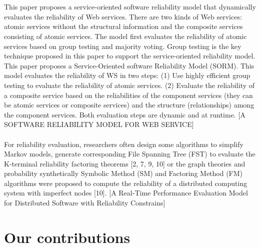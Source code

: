 \documentclass{cslthse-msc}
\begin{document}
\\\\
This paper proposes a service-oriented software reliability model that dynamically evaluates the reliability of Web services. There are two kinds of Web services: atomic services without the structural information and the composite services consisting of atomic services. The model first evaluates the reliability of atomic services based on group testing and majority voting. Group testing is the key technique proposed in this paper to support the service-oriented reliability model.
This paper proposes a Service-Oriented software Reliability Model (SORM). This model evaluates the reliability of WS in two steps: (1) Use highly efficient group testing to evaluate the reliability of atomic services.
(2) Evaluate the reliability of a composite service based on the reliabilities of the component services (they can be atomic services or composite services) and the structure (relationships) among the component services. Both evaluation steps are dynamic and at runtime. [A SOFTWARE RELIABILITY MODEL FOR WEB SERVICE]
\\\\
For reliability evaluation, researchers often design some algorithms to simplify Markov models, generate corresponding File Spanning Tree (FST) to evaluate the K-terminal reliability factoring theorems [2, 7, 9, 10] or the graph theories and probability synthetically 
Symbolic Method (SM) and Factoring Method (FM) algorithms were proposed to compute the reliability of a distributed computing system with imperfect nodes [10].
[A Real-Time Performance Evaluation Model for Distributed Software with Reliability Constrains]
\cite{taskSchedulingReplication}


\section{Our contributions}
\end{document}
